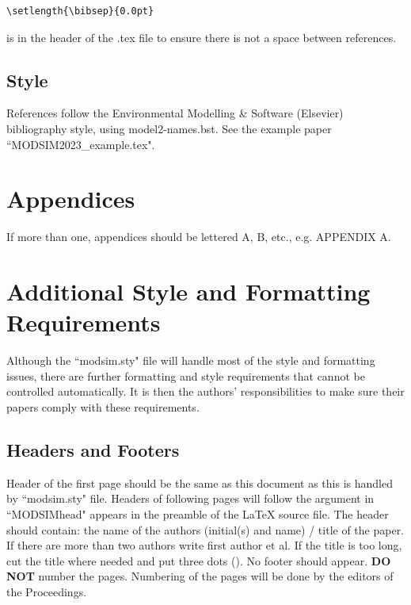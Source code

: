 \documentclass[a4paper,fleqn]{article} %
\begin{document}
\begin{verbatim}
\setlength{\bibsep}{0.0pt}
\end{verbatim}

is in the header of the .tex file to ensure there is not a space between references.

\subsection*{Style}
References follow the Environmental Modelling \& Software (Elsevier) bibliography style, using model2-names.bst. See the example paper ``MODSIM2023\_example.tex".




\section*{Appendices}
If more than one, appendices should be lettered A, B, etc., e.g.  APPENDIX A.

\section{Additional Style and Formatting Requirements}

Although the ``modsim.sty" file will handle most of the style and formatting issues, there are further formatting and style requirements that cannot be controlled automatically. It is then the authors' responsibilities to make sure their papers comply with these requirements.

\subsection{Headers and Footers}
Header of the first page should be the same as this document as this is handled by ``modsim.sty" file. Headers of following pages will follow the argument in ``MODSIMhead" appears in the preamble of the \LaTeX{} source file. The header should contain: the name of the authors (initial(s) and name) / title of the paper. If there are more than two authors write first author et al. If the title is too long, cut the title where needed and put three dots (). No footer should appear. \textbf{DO NOT} number the pages. Numbering of the pages will be done by the editors of the Proceedings.
\end{document}
